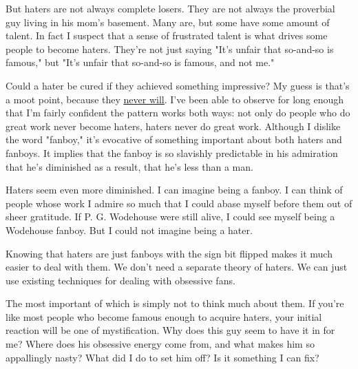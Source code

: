 But haters
                  are not always complete losers. They are not always the
                  proverbial guy living in his mom's basement. Many are, but
                  some have some amount of talent. In fact I suspect that a
                  sense of frustrated talent is what drives some people to
                  become haters. They're not just saying "It's unfair that
                  so-and-so is famous," but "It's unfair that so-and-so is
                  famous, and not me."

Could a hater be cured if they
                  achieved something impressive? My guess is that's a moot
                  point, because they \href{http://www.paulgraham.com/mean.html}{\underline{never will}}. I've been able to observe for long enough that I'm fairly
                  confident the pattern works both ways: not only do people who
                  do great work never become haters, haters never do great work.
                  Although I dislike the word "fanboy," it's evocative of
                  something important about both haters and fanboys. It implies
                  that the fanboy is so slavishly predictable in his admiration
                  that he's diminished as a result, that he's less than a
                  man.

Haters seem even more diminished. I can
                  imagine being a fanboy. I can think of people whose work I
                  admire so much that I could abase myself before them out of
                  sheer gratitude. If P. G. Wodehouse were still alive, I could
                  see myself being a Wodehouse fanboy. But I could not imagine
                  being a hater.

Knowing that haters are just fanboys
                  with the sign bit flipped makes it much easier to deal with
                  them. We don't need a separate theory of haters. We can just
                  use existing techniques for dealing with obsessive fans.

The
                  most important of which is simply not to think much about
                  them. If you're like most people who become famous enough to
                  acquire haters, your initial reaction will be one of
                  mystification. Why does this guy seem to have it in for me?
                  Where does his obsessive energy come from, and what makes him
                  so appallingly nasty? What did I do to set him off? Is it
                  something I can fix?

